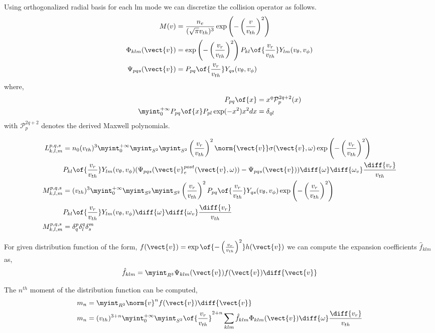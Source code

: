 Using orthogonalized radial basis for each lm mode we can discretize the collision operator as follows. 
\begin{align*}
M(v) & = \frac{n_e}{(\sqrt{\pi}v_{th})^3} \exp{\left(-\left(\frac{v}{v_{th}}\right)^2 \right)} \\
\Phi_{klm} (\vect{v}) &= \exp\left(-\left(\frac{v_r}{v_{th}}\right) ^ 2\right)  P_{kl}\of{\frac{v_r}{v_{th}}} Y_{lm}(v_\theta,v_\phi) \\
\Psi_{pqs} (\vect{v}) &= P_{pq}\of{\frac{v_r}{v_{th}}} Y_{qs}(v_\theta,v_\phi)
\end{align*} where, 
\begin{align*}
P_{pq}\of{x}  &= x^q \mathcal{P}^{2q+2}_p(x)  \\
\myint_{0}^{+\infty} P_{pq}\of{x} P_{pl} \exp(-x^2) x^2 dx &= \delta_{ql}
\end{align*} with $\mathcal{P}^{2q+2}_p$ denotes the derived Maxwell polynomials. 


\begin{align*}
{L}_{k,l,m}^{p,q,s} &=n_0 (v_{th})^3 \myint_{0}^{+\infty} \myint_{S^2} \myint_{S^2} \left(\frac{v_r}{v_{th}}\right)^{2} \norm{\vect{v}} \sigma(\vect{v},\omega) \exp\left(-\left(\frac{v_r}{v_{th}}\right) ^ 2\right) \\
&P_{kl}\of{\frac{v_r}{v_{th}}} Y_{lm}(v_\theta,v_\phi)  (\Psi_{pqs}(\vect{v}_e^{post}(\vect{v},\omega)) - \Psi_{pqs}(\vect{v})) \diff{\omega} \diff{\omega_v} \frac{\diff{v_r}}{v_{th}} \\
{M}_{k,l,m}^{p,q,s} &= (v_{th})^3 \myint_{0}^{+\infty} \myint_{S^2} \myint_{S^2} 
\left(\frac{v_r}{v_{th}}\right)^{2} P_{pq}\of{\frac{v_r}{v_{th}}} Y_{qs}(v_\theta,v_\phi) \exp\left(-\left(\frac{v_r}{v_{th}}\right) ^ 2\right)  \\& P_{kl}\of{\frac{v_r}{v_{th}}} Y_{lm}(v_\theta,v_\phi) \diff{\omega} \diff{\omega_v} \frac{\diff{v_r}}{v_{th}} \\
{M}_{k,l,m}^{p,q,s} &= \delta^p_q \delta^q_l \delta^m_s
\end{align*}

For given distribution function of the form, $f(\vect{v}) = \exp\of{-\left(\frac{v_r}{v_{th}}\right)^2}h(\vect{v})$ we can compute the expansion coefficients $\hat{f}_{klm}$ as, 
\begin{align*}
\hat{f}_{klm} = \myint_{R^3} \Psi_{klm}(\vect{v}) f(\vect{v}) \diff{\vect{v}}
\end{align*}

The $n^{th}$ moment of the distribution function can be computed,
\begin{align*}
m_n&=\myint_{R^3} \norm{v}^n f(\vect{v}) \diff{\vect{v}}\\
m_n&=(v_{th})^{3+n}\myint_{0}^{+\infty} \myint_{S^2} \of{\frac{v_r}{v_{th}}}^{2+n} \sum_{klm} \hat{f}_{klm} \Phi_{klm}(\vect{v}) \diff{\omega}\frac{\diff{v_r}}{v_{th}}
\end{align*}

